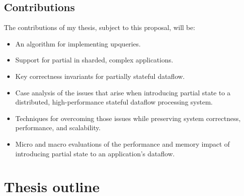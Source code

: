 \documentclass[fontsize=12pt,paper=letter]{scrartcl}
\begin{document}
\subsection{Contributions}

The contributions of my thesis, subject to this proposal, will be:

\begin{itemize}
 \item An algorithm for implementing upqueries.
 \item Support for partial in sharded, complex applications.
 \item Key correctness invariants for partially stateful dataflow.
 \item Case analysis of the issues that arise when introducing partial state to
	 a distributed, high-performance stateful dataflow processing system.
 \item Techniques for overcoming those issues while preserving system
	 correctness, performance, and scalability.
 \item Micro and macro evaluations of the performance and memory impact of
	 introducing partial state to an application's dataflow.
\end{itemize}

\section{Thesis outline}
\end{document}

